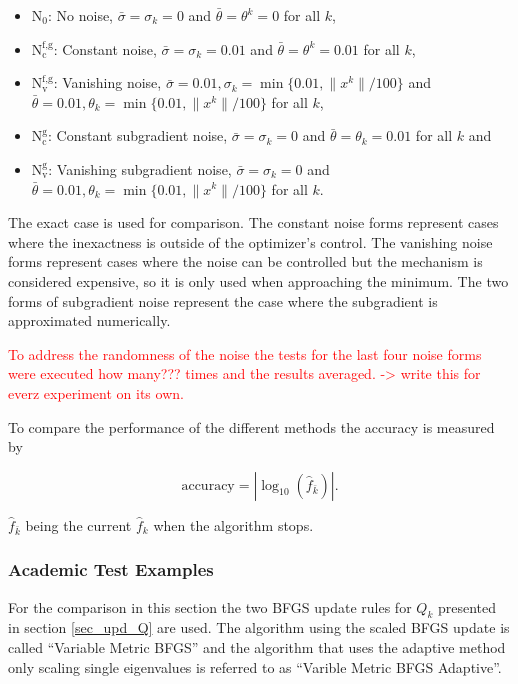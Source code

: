 \begin{itemize}[label={--}]
	\item \(\text{N}_0\): No noise, \(\bar{\sigma}=\sigma_k=0\) and \(\bar{\theta}=\theta^k=0\) for all \(k\),
	\item \(\text{N}_{\text{c}}^{\text{f,g}}\): Constant noise, \(\bar{\sigma}=\sigma_k=0.01\) and \(\bar{\theta}=\theta^k=0.01\) for all \(k\),
	\item \(\text{N}_{\text{v}}^{\text{f,g}}\): Vanishing noise, \(\bar{\sigma}=0.01, \sigma_k = \min\{0.01,\|x^k\|/100\}\) and \(\bar{\theta}=0.01, \theta_k=\min\{0.01,\|x^k\|/100\}\) for all \(k\),
	\item \(\text{N}_{\text{c}}^{\text{g}}\): Constant subgradient noise, \(\bar{\sigma}=\sigma_k=0\) and \(\bar{\theta}=\theta_k=0.01\) for all \(k\) and 
	\item \(\text{N}_{\text{v}}^{\text{g}}\): Vanishing subgradient noise, \(\bar{\sigma}=\sigma_k=0\) and \(\bar{\theta}=0.01, \theta_k=\min\{0.01,\|x^k\|/100\}\) for all \(k\).
\end{itemize}
The exact case is used for comparison. The constant noise forms represent cases where the inexactness is outside of the optimizer's control. The vanishing noise forms represent cases where the noise can be controlled  but the mechanism is considered expensive, so it is only used when approaching the minimum.
The two forms of subgradient noise represent the case where the subgradient is approximated numerically.

\textcolor{red}{To address the randomness of the noise the tests for the last four noise forms were executed {how many???} times and the results averaged. -> write this for everz experiment on its own.}

To compare the performance of the different methods the accuracy is measured by

\[ \text{accuracy} = |\log_{10}(\hat{f}_{\bar{k}})|. \]

\(\hat{f}_{\bar{k}}\) being the current \(\hat{f}_k\) when the algorithm stops.



\subsubsection{Academic Test Examples}

For the comparison in this section the two BFGS update rules for \(Q_k\) presented in section \ref{sec_upd_Q} are used. The algorithm using the scaled BFGS update is called ``Variable Metric BFGS'' and the algorithm that uses the adaptive method only scaling single eigenvalues is referred to as ``Varible Metric BFGS Adaptive''.

